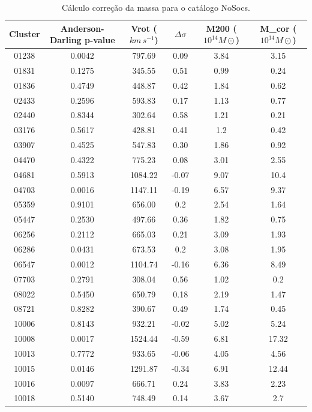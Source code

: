 {\scriptsize
\begin{longtable}{cccccc}
\caption{Cálculo correção da massa para o catálogo NoSocs.}
\label{tab:massnosocs}
\\ \hline
\textbf{Cluster} & \textbf{Anderson-Darling p-value} & \textbf{Vrot ($km \, s^{-1}$)} & \textbf{$\Delta \sigma$} &\textbf{M200 ($10^{14}  M\odot$)} & \textbf{M_{cor} ($10^{14}  M\odot$)}\\ \hline
01238 & {\color{red}0.0042} & 797.69 & 0.09 & 3.84 & 3.15 \\
01831 & 0.1275 & 345.55 & 0.51 & 0.99 & 0.24 \\
01836 & 0.4749 & 448.87 & 0.42 & 1.84 & 0.62 \\
02433 & 0.2596 & 593.83 & 0.17 & 1.13 & 0.77 \\
02440 & 0.8344 & 302.64 & 0.58 & 1.21 & 0.21 \\
03176 & 0.5617 & 428.81 & 0.41 & 1.2 & 0.42 \\
03907 & 0.4525 & 547.83 & 0.30 & 1.86 & 0.92 \\
04470 & 0.4322 & 775.23 & 0.08 & 3.01 & 2.55 \\
04681 & 0.5913 & 1084.22 & -0.07 & 9.07 & 10.4 \\
04703 & {\color{red}0.0016} & 1147.11 & -0.19 & 6.57 & 9.37 \\
05359 & 0.9101 & 656.00 & 0.2 & 2.54 & 1.64 \\
05447 & 0.2530 & 497.66 & 0.36 & 1.82 & 0.75 \\
06256 & 0.2112 & 665.03 & 0.21 & 3.09 & 1.93 \\
06286 & {\color{red}0.0431} & 673.53 & 0.2 & 3.08 & 1.95 \\
06547 & {\color{red}0.0012} & 1104.74 & -0.16 & 6.36 & 8.49 \\
07703 & 0.2791 & 308.04 & 0.56 & 1.02 & 0.2 \\
08022 & 0.5450 & 650.79 & 0.18 & 2.19 & 1.47 \\
08721 & 0.8282 & 390.67 & 0.49 & 1.74 & 0.45 \\
10006 & 0.8143 & 932.21 & -0.02 & 5.02 & 5.24 \\
10008 & {\color{red}0.0017} & 1524.44 & -0.59 & 6.81 & 17.32 \\
10013 & 0.7772 & 933.65 & -0.06 & 4.05 & 4.56 \\
10015 & {\color{red}0.0146} & 1291.87 & -0.34 & 6.91 & 12.44 \\
10016 & {\color{red}0.0097} & 666.71 & 0.24 & 3.83 & 2.23 \\
10018 & 0.5140 & 748.49 & 0.14 & 3.67 & 2.7 \\

\end{longtable}}
